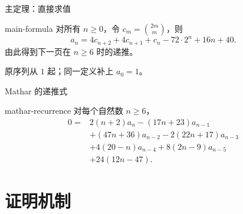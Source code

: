 \documentclass{beamer}
\begin{document}
\begin{frame}{主定理：直接求值}
\begin{bookresult}{main-formula}
对所有 $n\ge0$，令 $c_m=\binom{2m}m$，则
\[
a_n=4c_{n+2}+4c_{n+1}+c_n-72\cdot2^n+16n+40.
\]
由此得到下一页在 $n\ge6$ 时的递推。
\end{bookresult}
原序列从 $1$ 起；同一定义补上 $a_0=1$。
\end{frame}
\begin{frame}{Mathar 的递推式}
\begin{bookresult}{mathar-recurrence}
对每个自然数 $n\ge6$，
\small
\[
\begin{aligned}
0={}&2(n+2)a_n-(17n+23)a_{n-1}\\
&+(47n+36)a_{n-2}-2(22n+17)a_{n-3}\\
&+4(20-n)a_{n-4}+8(2n-9)a_{n-5}\\
&+24(12n-47).
\end{aligned}
\]
\end{bookresult}
\end{frame}
\section{证明机制}
\end{document}
